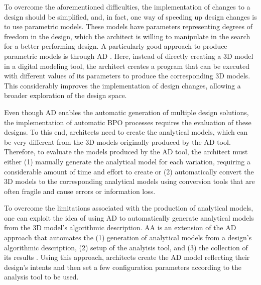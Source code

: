	To overcome the aforementioned difficulties, the implementation of changes to a design should be simplified, and, in fact, one way of speeding up design changes is to use parametric models. These models have parameters representing degrees of freedom in the design, which the architect is willing to manipulate in the search for a better performing design. A particularly good approach to produce parametric models is through \ac{AD} \cite{Terzidis2006}. Here, instead of directly creating a 3D model in a digital modeling tool, the architect creates a program that can be executed with different values of its parameters to produce the corresponding 3D models. This considerably improves the implementation of design changes, allowing a broader exploration of the design space.
	
	Even though \ac{AD} enables the automatic generation of multiple design solutions, the implementation of automatic \ac{BPO} processes requires the evaluation of these designs. To this end, architects need to create the analytical models, which can be very different from the 3D models originally produced by the \ac{AD} tool. Therefore, to evaluate the models produced by the \ac{AD} tool, the architect must either (1) manually generate the analytical model for each variation, requiring a considerable amount of time and effort to create or (2) automatically convert the 3D models to the corresponding analytical models using conversion tools that are often fragile and cause errors or information loss. 
	
	To overcome the limitations associated with the production of analytical models, one can exploit the idea of using \ac{AD} to automatically generate analytical models from the 3D model's algorithmic description. \ac{AA} is an extension of the \ac{AD} approach that automates the (1) generation of analytical models from a design's algorithmic description, (2) setup of the analyisis tool, and (3) the collection of its results \cite{Aguiar2017}. Using this approach, architects create the \ac{AD} model reflecting their design's intents and then set a few configuration parameters according to the analysis tool to be used. %
	
